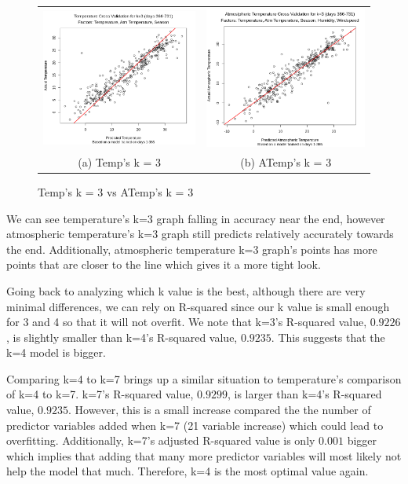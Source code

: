 \documentclass[12pt]{article}
\begin{document}
\begin{figure}[H]
\begin{tabular}{cc}
  \includegraphics[width=.5\linewidth]{tempxvalidk=3.png} &  
  \includegraphics[width=.5\linewidth]{atempwindhumk=3.png} \\
(a) Temp's k = 3 & (b) ATemp's k = 3 \\[6pt]
\end{tabular}
\caption{Temp's k = 3 vs ATemp's k = 3}
\end{figure}

We can see temperature's k=3 graph falling in accuracy near the end, however atmospheric temperature's k=3 graph still predicts relatively accurately towards the end. Additionally, atmospheric temperature k=3 graph's points has more points that are closer to the line which gives it a more tight look.

Going back to analyzing which k value is the best, although there are very minimal differences, we can rely on R-squared since our k value is small enough for 3 and 4 so that it will not overfit. We note that k=3's R-squared value, $0.9226$, is slightly smaller than k=4's R-squared value, $0.9235$. This suggests that the k=4 model is bigger.

Comparing k=4 to k=7 brings up a similar situation to temperature's comparison of k=4 to k=7. k=7's R-squared value, $0.9299$, is larger than k=4's R-squared value, $0.9235$. However, this is a small increase compared the the number of predictor variables added when k=7 (21 variable increase) which could lead to overfitting. Additionally, k=7's adjusted R-squared value is only $0.001$ bigger which implies that adding that many more predictor variables will most likely not help the model that much. Therefore, k=4 is the most optimal value again.
\end{document}
